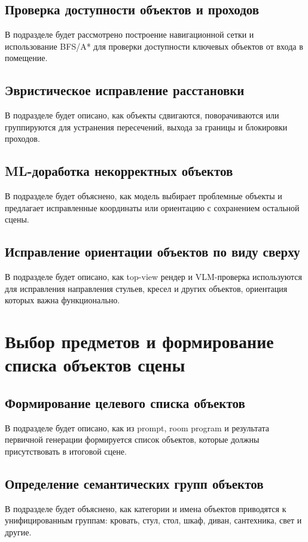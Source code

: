 \documentclass[times]{itmo-student-thesis}
\begin{document}
\subsection{Проверка доступности объектов и проходов}
В подразделе будет рассмотрено построение навигационной сетки и использование BFS/A* для проверки доступности ключевых объектов от входа в помещение.

\subsection{Эвристическое исправление расстановки}
В подразделе будет описано, как объекты сдвигаются, поворачиваются или группируются для устранения пересечений, выхода за границы и блокировки проходов.

\subsection{ML-доработка некорректных объектов}
В подразделе будет объяснено, как модель выбирает проблемные объекты и предлагает исправленные координаты или ориентацию с сохранением остальной сцены.

\subsection{Исправление ориентации объектов по виду сверху}
В подразделе будет описано, как top-view рендер и VLM-проверка используются для исправления направления стульев, кресел и других объектов, ориентация которых важна функционально.

\section{Выбор предметов и формирование списка объектов сцены}

\subsection{Формирование целевого списка объектов}
В подразделе будет описано, как из prompt, room program и результата первичной генерации формируется список объектов, которые должны присутствовать в итоговой сцене.

\subsection{Определение семантических групп объектов}
В подразделе будет объяснено, как категории и имена объектов приводятся к унифицированным группам: кровать, стул, стол, шкаф, диван, сантехника, свет и другие.
\end{document}

